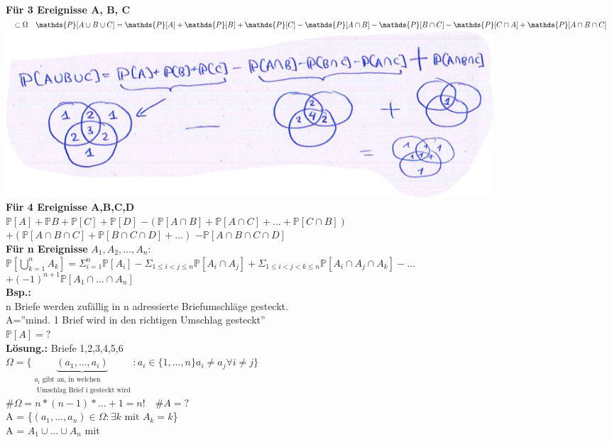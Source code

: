 	\textbf{Für 3 Ereignisse A, B, C} $\subset \Omega \quad \mathds{P}[A\cup B \cup C]=
	\\\mathds{P}[A]+\mathds{P}[B]+\mathds{P}[C]-\mathds{P}[A\cap B] - \mathds{P}[B \cap C]-\mathds{P}[C\cap A] + \mathds{P}[A\cap B \cap C]$\medskip\\
	\includegraphics[width=0.8\textwidth]{img/sieb.PNG}\medskip\\
	\textbf{Für 4 Ereignisse A,B,C,D}\\
	$\mathds{P}[A]+\mathds{P}B+\mathds{P}[C]+\mathds{P}[D]$
	$-(\mathds{P}[A\cap B]+\mathds{P}[A\cap C ]+...+\mathds{P}[C\cap B]) $\smallskip
\\	$+ (\mathds{P}[A \cap B \cap C ] + \mathds{P}[B \cap C \cap D]+...)$
	$-\mathds{P}[A\cap B \cap C \cap D]$\medskip\\
	\textbf{Für n Ereignisse} $A_1,A_2,...,A_n$:\\
	$\mathds{P}[\bigcup^n_{k=1}A_k]=\Sigma^n_{i=1}\mathds{P}[A_i]-\Sigma_{1\leq i < j \leq n}\mathds{P}[A_i\cap A_j]+\Sigma_{1\leq i < j<k\leq n} \mathds{P}[A_i\cap A_j\cap A_k]- ... $\smallskip\\
	$+ (-1)^{n+1}\mathds{P}[A_1\cap ... \cap A_n]$\medskip\\
	\textbf{Bsp.:}\\
n Briefe werden zufällig in n adressierte Briefumschläge gesteckt.\\
A=''mind. 1 Brief wird in den richtigen Umschlag gesteckt''\\
$\mathds{P}[A] = ?$\medskip\\
\textbf{Lösung.:} \hspace{3cm} Briefe 1,2,3,4,5,6\\
$\Omega = \{\underbrace{(a_1,...,a_i)}_{\substack{a_i\text{ gibt an, in welchen}\\\text{ Umschlag Brief i gesteckt wird}}}: a_i \in \{1,...,n\} a_i \neq a_j \forall i \neq j \}$\medskip\\
\#$\Omega = n*(n-1)*...+1=n! \quad \#A = ?$\\
A = \{$(a_1,...,a_n)\in \Omega: \exists k \text{ mit } A_k = k$\}\medskip\\
A = $A_1\cup ...\cup A_n$ mit \\
